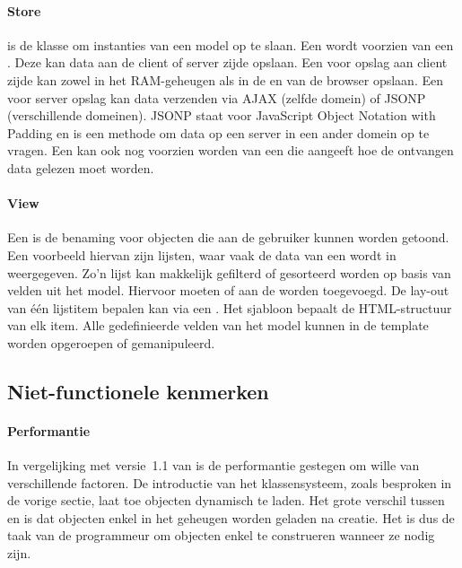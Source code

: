 \paragraph{Store}
 is de klasse om instanties van een model op te slaan.  
Een  wordt voorzien van een .  
Deze kan data aan de client of server zijde opslaan.  
Een  voor opslag aan client zijde kan zowel in het RAM-geheugen als in de  en  van de browser opslaan.  
Een  voor server opslag kan data verzenden via AJAX (zelfde domein) of JSONP (verschillende domeinen).  
JSONP staat voor JavaScript Object Notation with Padding en is een methode om data op een server in een ander domein op te vragen.
Een  kan ook nog voorzien worden van een  die aangeeft hoe de ontvangen data gelezen moet worden.

\paragraph{View}
Een  is de benaming voor objecten die aan de gebruiker kunnen worden getoond.  
Een voorbeeld hiervan zijn lijsten,  waar vaak de data van een  wordt in weergegeven.  
Zo'n lijst kan makkelijk gefilterd of gesorteerd worden op basis van velden uit het model.
Hiervoor moeten  of  aan de  worden toegevoegd. 
De lay-out van één lijstitem bepalen kan via een .  
Het sjabloon bepaalt de HTML-structuur van elk item.  
Alle gedefinieerde velden van het model kunnen in de template worden opgeroepen of gemanipuleerd.


\subsection{Niet-functionele kenmerken}
\paragraph{Performantie}
In vergelijking met versie~1.1 van \st{} is de performantie gestegen om wille van verschillende factoren.  
De introductie van het klassensysteem,  zoals besproken in de vorige sectie,  laat toe objecten dynamisch te laden. 
Het grote verschil tussen  en  is dat objecten enkel in het geheugen worden geladen na creatie.  
Het is dus de taak van de programmeur om objecten enkel te construeren wanneer ze nodig zijn.


